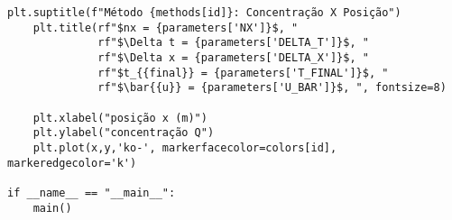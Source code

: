 \begin{Verbatim}[fontsize=\footnotesize]
    plt.suptitle(f"Método {methods[id]}: Concentração X Posição")
    plt.title(rf"$nx = {parameters['NX']}$, "
              rf"$\Delta t = {parameters['DELTA_T']}$, "
              rf"$\Delta x = {parameters['DELTA_X']}$, "
              rf"$t_{{final}} = {parameters['T_FINAL']}$, "
              rf"$\bar{{u}} = {parameters['U_BAR']}$, ", fontsize=8)

    plt.xlabel("posição x (m)")
    plt.ylabel("concentração Q")
    plt.plot(x,y,'ko-', markerfacecolor=colors[id], markeredgecolor='k')

if __name__ == "__main__":
    main()
\end{Verbatim}